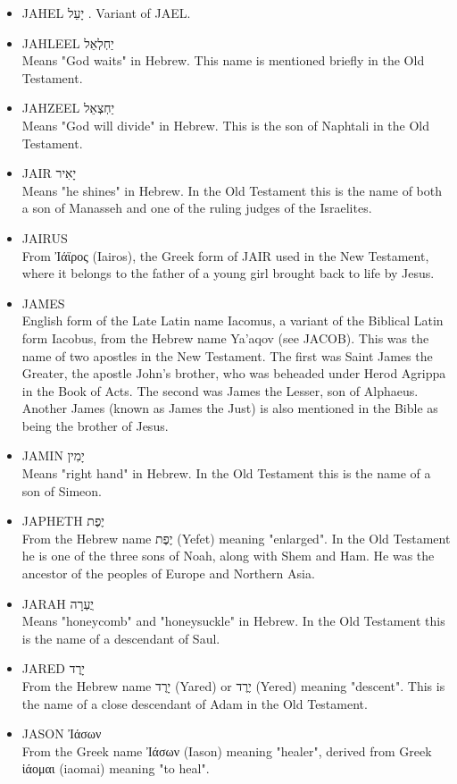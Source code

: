 \begin{itemize}
\item JAHEL יָעֵל . Variant of JAEL.
\item JAHLEEL יַחְלְאֵל \\
Means "God waits" in Hebrew. This name is mentioned briefly in the Old Testament.
\item JAHZEEL יַחְצְאֵל \\
Means "God will divide" in Hebrew. This is the son of Naphtali in the Old Testament.
\item JAIR יָאִיר \\
Means "he shines" in Hebrew. In the Old Testament this is the name of both a son of Manasseh and one of the ruling judges of the Israelites.
\item JAIRUS \\
From Ἰάϊρος (Iairos), the Greek form of JAIR used in the New Testament, where it belongs to the father of a young girl brought back to life by Jesus.
\item JAMES \\
English form of the Late Latin name Iacomus, a variant of the Biblical Latin form Iacobus, from the Hebrew name Ya'aqov (see JACOB). This was the name of two apostles in the New Testament. The first was Saint James the Greater, the apostle John's brother, who was beheaded under Herod Agrippa in the Book of Acts. The second was James the Lesser, son of Alphaeus. Another James (known as James the Just) is also mentioned in the Bible as being the brother of Jesus.
\item JAMIN יָמִין \\
Means "right hand" in Hebrew. In the Old Testament this is the name of a son of Simeon.
\item JAPHETH יֶפֶת \\
From the Hebrew name יֶפֶת (Yefet) meaning "enlarged". In the Old Testament he is one of the three sons of Noah, along with Shem and Ham. He was the ancestor of the peoples of Europe and Northern Asia.
\item JARAH יֲעְרָה \\
Means "honeycomb" and "honeysuckle" in Hebrew. In the Old Testament this is the name of a descendant of Saul.
\item JARED יָרֶד \\
From the Hebrew name יָרֶד (Yared) or יֶרֶד (Yered) meaning "descent". This is the name of a close descendant of Adam in the Old Testament.

\item JASON Ἰάσων \\
From the Greek name Ἰάσων (Iason) meaning "healer", derived from Greek ἰάομαι (iaomai) meaning "to heal". 


\end{itemize}
